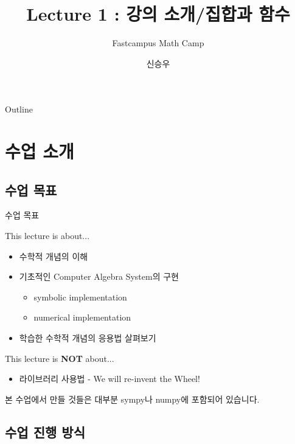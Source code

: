\documentclass{beamer}
\title{Lecture 1 : 강의 소개/집합과 함수}
\subtitle{Fastcampus Math Camp}
\author{신승우}
\begin{document}
\begin{frame}
  \titlepage
\end{frame}

\begin{frame}{Outline}
  \tableofcontents[hideallsubsections]
\end{frame}


\section{수업 소개}

\subsection{수업 목표} 

\begin{frame}{수업 목표} 

This lecture is about... 
\begin{itemize} 
\item 수학적 개념의 이해 
\item 기초적인 Computer Algebra System의 구현
\begin{itemize} 
\item symbolic implementation 
\item numerical implementation 
\end{itemize}
\item 학습한 수학적 개념의 응용법 살펴보기 
\end{itemize}

\end{frame}

\begin{frame}
This lecture is \textbf{NOT} about... 

\begin{itemize} 
\item 라이브러리 사용법 - We will re-invent the Wheel! 
\end{itemize}

본 수업에서 만들 것들은 대부분 sympy나 numpy에 포함되어 있습니다. 


\end{frame}

\subsection{수업 진행 방식} 
\end{document}
